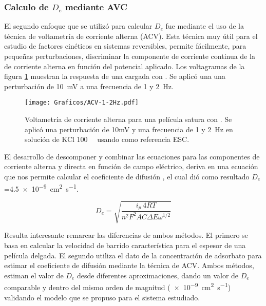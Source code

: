 	 \subsubsection*{Calculo de $D_e$ mediante AVC}

    	 El segundo enfoque que se utilizó para calcular $D_e$ fue mediante el uso de la técnica de voltametría de corriente alterna (ACV). Esta técnica muy útil para el estudio de factores cinéticos en sistemas reversibles, permite fácilmente, para pequeñas perturbaciones, discriminar la componente de corriente continua de la de corriente alterna en función del potencial aplicado. Los voltagramas de la figura \ref{fig:acv} muestran la respuesta de una \pdmF\space cargada con \ru. Se aplicó una una perturbación de \SI{10}{\milli\volt} a una frecuencia de 1 y \SI{2}{\hertz}.

	 			\begin{figure}[ht]
					\centering
			 	    \texttt{[image: Graficos/ACV-1-2Hz.pdf]}
			        \caption[Voltametrías de corriente alterna]{Voltametría de corriente alterna para una película satura con \ru. Se aplicó una perturbación de 10mV y una frecuencia de 1 y \SI{2}{\hertz} en solución de KCl \SI{100}{\milli\Molar} usando como referencia ESC.}
			        \label{fig:acv}
			      	\end{figure}

    	 El desarrollo de descomponer y combinar las ecuaciones para las componentes de corriente alterna y directa en función de campo eléctrico, deriva en una ecuación que nos permite calcular el coeficiente de difusión \cite{Wi2000}, el cual dió como resultado $D_e$=\SI{4.5e-9}{\square\cm\per\second}. 
    	 	
    	 		\begin{equation}
					D_e=\sqrt{\frac{i_p\ 4RT}{n^2 F^2 A C \Delta E \omega ^{1/2}}}
					\label{eq:acv}
				 \end{equation}

		Resulta interesante remarcar las diferencias de ambos métodos. El primero se basa en calcular la velocidad de barrido característica para el espesor de una película delgada. El segundo utiliza el dato de la concentración de adsorbato para estimar el coeficiente de difusión mediante la técnica de ACV. Ambos métodos, estiman el valor de $D_e$ desde diferentes aproximaciones, dando un valor de $D_e$ comparable y dentro del mismo orden de magnitud (\SI{e-9}{\square\cm\per\second}) validando el modelo que se propuso para el sistema estudiado.
			
